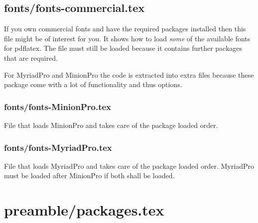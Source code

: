 
\subsection{fonts/fonts-commercial.tex}
If you own commercial fonts and have the required \latex packages installed then this file might be of interest for you. It shows how to load \emph{some} of the available fonts for pdflatex. The file  must still be loaded because it contains further packages that are required.

For MyriadPro and MinionPro the code is extracted into extra files %
because these package come with a lot of functionality and thus options.


\subsubsection{fonts/fonts-MinionPro.tex}
File that loads MinionPro and takes care of the package loaded order.


\subsubsection{fonts/fonts-MyriadPro.tex}
File that loads MyriadPro and takes care of the package loaded order. MyriadPro must be loaded after MinionPro if both shall be loaded.


\section{preamble/packages.tex}

